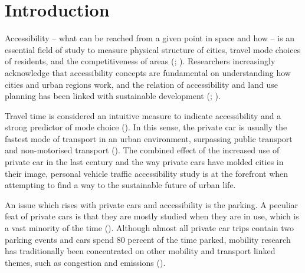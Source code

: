 \section{Introduction}
\justify

Accessibility -- what can be reached from a given point in space and how -- is an essential field of study to measure physical structure of cities, travel mode choices of residents, and the competitiveness of areas (\cite{Bertolini2005}; \cite{Toivonen2014a}). Researchers increasingly acknowledge that accessibility concepts are fundamental on understanding how cities and urban regions work, and the relation of accessibility and land use planning has been linked with sustainable development (\cite{TeBrommelstroet2014}; \cite{Wegener1999}).

Travel time is considered an intuitive measure to indicate accessibility and a strong predictor of mode choice (\cite{Frank2008}). In this sense, the private car is usually the fastest mode of transport in an urban environment, surpassing public transport and non-motorised transport (\cite{Salonen2014}). The combined effect of the increased use of private car in the last century and the way private cars have molded cities in their image, personal vehicle traffic accessibility study is at the forefront when attempting to find a way to the sustainable future of urban life. 

An issue which rises with private cars and accessibility is the parking. A peculiar feat of private cars is that they are mostly studied when they are in use, which is a vast minority of the time (\cite{Diallo2015}). Although almost all private car trips contain two parking events and cars spend 80 percent of the time parked, mobility research has traditionally been concentrated on other mobility and transport linked themes, such as congestion and emissions (\cite{Bates2012}). 

